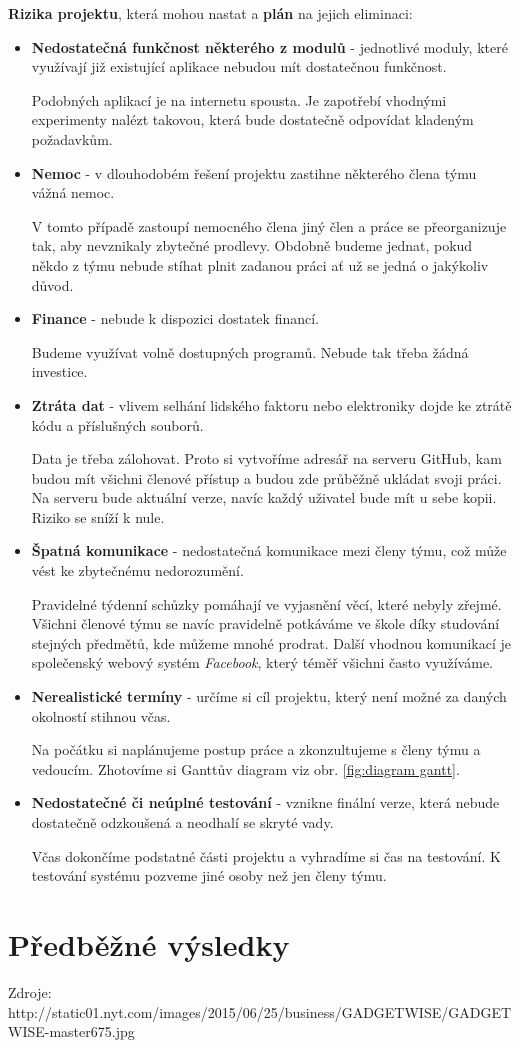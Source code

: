 \documentclass[12pt,a4paper]{article}
\begin{document}
\noindent \textbf{Rizika projektu}, která mohou nastat a \textbf{plán} na jejich eliminaci: 

\begin{itemize}
	\item{\textbf{Nedostatečná funkčnost některého z modulů}} - jednotlivé moduly, které využívají již existující aplikace nebudou mít dostatečnou funkčnost.
	
	Podobných aplikací je na internetu spousta. Je zapotřebí vhodnými experimenty nalézt takovou, která bude dostatečně odpovídat kladeným požadavkům.  
	
	\item{\textbf{Nemoc}} - v dlouhodobém řešení projektu zastihne některého člena týmu vážná nemoc. 
	
	V tomto případě zastoupí nemocného člena jiný člen a práce se přeorganizuje tak, aby nevznikaly zbytečné prodlevy. Obdobně budeme jednat, pokud někdo z týmu nebude stíhat plnit zadanou práci ať už se jedná o jakýkoliv důvod. 
	
	\item{\textbf{Finance}} - nebude k dispozici dostatek financí.
	
	Budeme využívat volně dostupných programů. Nebude tak třeba žádná investice.
	
	\item{\textbf{Ztráta dat}} - vlivem selhání lidského faktoru nebo elektroniky dojde ke ztrátě kódu a příslušných souborů.
	
	Data je třeba zálohovat. Proto si vytvoříme adresář na serveru GitHub, kam budou mít všichni členové přístup a budou zde průběžně ukládat svoji práci. Na serveru bude aktuální verze, navíc každý uživatel bude mít u sebe kopii. Riziko se sníží k nule. 
	
	\item{\textbf{Špatná komunikace}} - nedostatečná komunikace mezi členy týmu, což může vést ke zbytečnému nedorozumění. 
	
	Pravidelné týdenní schůzky pomáhají ve vyjasnění věcí, které nebyly zřejmé. Všichni členové týmu se navíc pravidelně potkáváme ve škole díky studování stejných předmětů, kde můžeme mnohé prodrat. Další vhodnou komunikací je společenský webový systém \textit{Facebook}, který téměř všichni často využíváme.
	
	\item{\textbf{Nerealistické termíny}} - určíme si cíl projektu, který není možné za daných okolností stihnou včas.
	
	Na počátku si naplánujeme postup práce a zkonzultujeme s členy týmu a vedoucím. Zhotovíme si Ganttův diagram viz obr. \ref{fig:diagram gantt}.
	
	\item{\textbf{Nedostatečné či neúplné testování}} - vznikne finální verze, která nebude dostatečně odzkoušená a neodhalí se skryté vady.
	
	Včas dokončíme podstatné části projektu a vyhradíme si čas na testování. K testování systému pozveme jiné osoby než jen členy týmu. 
	
	 
	
\end{itemize}



\section*{Předběžné výsledky}

Zdroje:
http://static01.nyt.com/images/2015/06/25/business/GADGETWISE/GADGETWISE-master675.jpg
\end{document}
